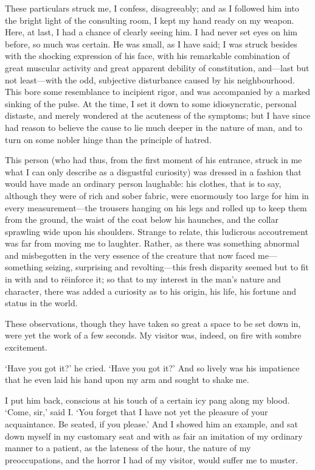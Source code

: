 \documentclass[]{novel}
\begin{document}
These particulars struck me, I confess, disagreeably; and as I followed him into the bright light of the consulting room, I kept my hand ready on my weapon. Here, at last, I had a chance of clearly seeing him. I had never set eyes on him before, so much was certain. He was small, as I have said; I was struck besides with the shocking expression of his face, with his remarkable combination of great muscular activity and great apparent debility of constitution, and—last but not least—with the odd, subjective disturbance caused by his neighbourhood. This bore some resemblance to incipient rigor, and was accompanied by a marked sinking of the pulse. At the time, I set it down to some idiosyncratic, personal distaste, and merely wondered at the acuteness of the symptoms; but I have since had reason to believe the cause to lie much deeper in the nature of man, and to turn on some nobler hinge than the principle of hatred.

This person (who had thus, from the first moment of his entrance, struck in me what I can only describe as a disgustful curiosity) was dressed in a fashion that would have made an ordinary person laughable: his clothes, that is to say, although they were of rich and sober fabric, were enormously too large for him in every measurement—the trousers hanging on his legs and rolled up to keep them from the ground, the waist of the coat below his haunches, and the collar sprawling wide upon his shoulders. Strange to relate, this ludicrous accoutrement was far from moving me to laughter. Rather, as there was something abnormal and misbegotten in the very essence of the creature that now faced me—something seizing, surprising and revolting—this fresh disparity seemed but to fit in with and to rëinforce it; so that to my interest in the man’s nature and character, there was added a curiosity as to his origin, his life, his fortune and status in the world.

These observations, though they have taken so great a space to be set down in, were yet the work of a few seconds. My visitor was, indeed, on fire with sombre excitement.

‘Have you got it?’ he cried. ‘Have you got it?’ And so lively was his impatience that he even laid his hand upon my arm and sought to shake me.

I put him back, conscious at his touch of a certain icy pang along my blood. ‘Come, sir,’ said I. ‘You forget that I have not yet the pleasure of your acquaintance. Be seated, if you please.’ And I showed him an example, and sat down myself in my customary seat and with as fair an imitation of my ordinary manner to a patient, as the lateness of the hour, the nature of my preoccupations, and the horror I had of my visitor, would suffer me to muster.
\end{document}
